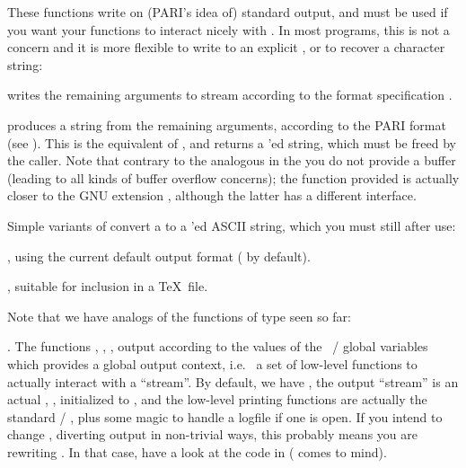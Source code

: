 These functions write on (PARI's idea of) standard output, and must be used
if you want your functions to interact nicely with . In most
programs, this is not a concern and it is more flexible to write to an
explicit , or to recover a character string:

 writes the
remaining arguments to stream  according to the format
specification .

 produces a string from the
remaining arguments, according to the PARI format  (see ).
This is the  equivalent of , and returns a
'ed string, which must be freed by the caller. Note that contrary
to the analogous  in the  you do not provide a buffer
(leading to all kinds of buffer overflow concerns); the function provided is
actually closer to the GNU extension , although the latter has
a different interface.

Simple variants of  convert a  to a
'ed ASCII string, which you must still  after use:

, using the current default output format
( by default).

, suitable for inclusion in a \TeX\ file.


Note that we have  analogs of the functions of  type
seen so far:




. The functions , ,
,  output according to the values of the
~/  global variables which provides a global
output context, i.e.~ a set of low-level functions to actually interact with
a ``stream''. By default, we have , the output
``stream'' is an actual , , initialized to
, and the low-level printing functions are actually the standard
 / , plus some magic to handle a logfile if one is open.
If you intend to change , diverting output in non-trivial ways,
this probably means you are rewriting . In that case, have a look at
the code in  ( comes to mind).

